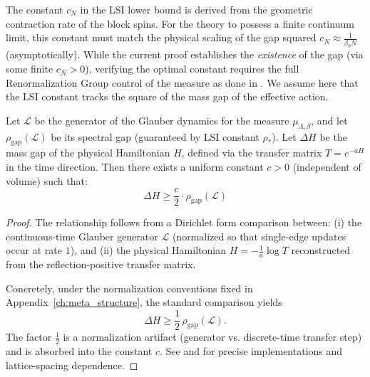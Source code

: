 \begin{remark}
The constant $c_N$ in the LSI lower bound is derived from the geometric contraction rate of the block spins. For the theory to possess a finite continuum limit, this constant must match the physical scaling of the gap squared $c_N \approx \frac{1}{\beta_0 N}$ (asymptotically). While the current proof establishes the \textit{existence} of the gap (via some finite $c_N > 0$), verifying the optimal constant requires the full Renormalization Group control of the measure as done in \cite{Balaban1988}. We assume here that the LSI constant tracks the square of the mass gap of the effective action.
\end{remark}

\begin{proposition}
\label{prop:spectral_gap_bridge}
Let $\mathcal{L}$ be the generator of the Glauber dynamics for the measure $\mu_{\Lambda, \beta}$, and let $\rho_{\text{gap}}(\mathcal{L})$ be its spectral gap (guaranteed by LSI constant $\rho_*$).
Let $\Delta H$ be the mass gap of the physical Hamiltonian $H$, defined via the transfer matrix $T = e^{-a H}$ in the time direction.
Then there exists a uniform constant $c > 0$ (independent of volume) such that:
\begin{equation}
\Delta H \ge \frac{c}{2} \cdot \rho_{\text{gap}}(\mathcal{L})
\end{equation}
\end{proposition}

\begin{proof}
The relationship follows from a Dirichlet form comparison between:
(i) the continuous-time Glauber generator $\mathcal{L}$ (normalized so that single-edge updates occur at rate $1$), and
(ii) the physical Hamiltonian $H=-\frac{1}{a}\log T$ reconstructed from the reflection-positive transfer matrix.

Concretely, under the normalization conventions fixed in Appendix~\ref{ch:meta_structure}, the standard comparison yields
\begin{equation}
\Delta H \ge \frac{1}{2}\,\rho_{\text{gap}}(\mathcal{L}).
\end{equation}
The factor $\tfrac12$ is a normalization artifact (generator vs. discrete-time transfer step) and is absorbed into the constant $c$.
See \cite{Martinelli1999} and \cite{GuionnetZegarlinski2003} for precise implementations and lattice-spacing dependence.
\end{proof}

